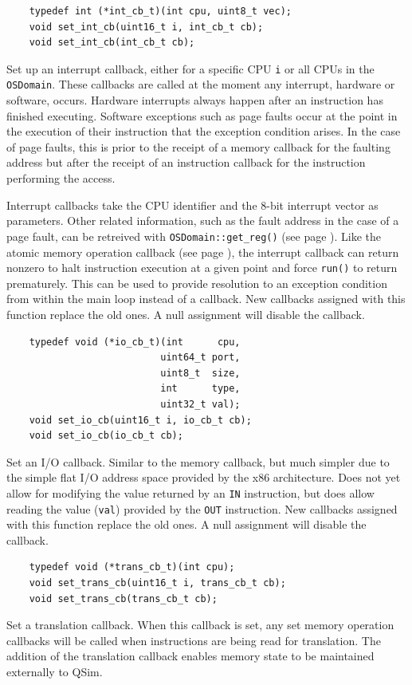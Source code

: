 \documentclass[letterpaper, 10pt]{book}
\begin{document}
\label{func:set_int_cb} \begin{verbatim}
    typedef int (*int_cb_t)(int cpu, uint8_t vec);
    void set_int_cb(uint16_t i, int_cb_t cb);
    void set_int_cb(int_cb_t cb);
\end{verbatim}
Set up an interrupt callback, either for a specific CPU \texttt{i} or all CPUs
in the \texttt{OSDomain}. These callbacks are called at the moment any
interrupt, hardware or software, occurs. Hardware interrupts always happen
after an instruction has finished executing. Software exceptions such as page
faults occur at the point in the execution of their instruction that the
exception condition arises. In the case of page faults, this is prior to the
receipt of a memory callback for the faulting address but after the receipt of
an instruction callback for the instruction performing the access.

Interrupt callbacks take the CPU identifier and the 8-bit interrupt vector as
parameters. Other related information, such as the fault address in the case of
a page fault, can be retreived with \texttt{OSDomain::get\_reg()} (see page 
\pageref{func:get_reg}).  Like the atomic memory operation callback (see page 
\pageref{func:set_atomic_cb}), the interrupt callback can return nonzero to
halt instruction execution at a given point and force \texttt{run()} to return
prematurely. This can be used to provide resolution to an exception condition
from within the main loop instead of a callback. New callbacks
assigned with this function replace the old ones. A null assignment will
disable the callback.

\label{func:set_io_cb} \begin{verbatim}
    typedef void (*io_cb_t)(int      cpu, 
                           uint64_t port, 
                           uint8_t  size, 
                           int      type, 
                           uint32_t val);
    void set_io_cb(uint16_t i, io_cb_t cb);
    void set_io_cb(io_cb_t cb);
\end{verbatim}
Set an I/O callback. Similar to the memory callback, but much simpler due to
the simple flat I/O address space provided by the x86 architecture. Does not
yet allow for modifying the value returned by an \texttt{IN} instruction, but
does allow reading the value (\texttt{val}) provided by the \texttt{OUT}
instruction. New callbacks assigned with this function replace the old ones. A
null assignment will disable the callback.

\label{func:set_trans_cb} \begin{verbatim}
    typedef void (*trans_cb_t)(int cpu);
    void set_trans_cb(uint16_t i, trans_cb_t cb);
    void set_trans_cb(trans_cb_t cb);
\end{verbatim}
Set a translation callback. When this callback is set, any set memory operation
callbacks will be called when instructions are being read for translation. The
addition of the translation callback enables memory state to be maintained
externally to QSim.
\end{document}
